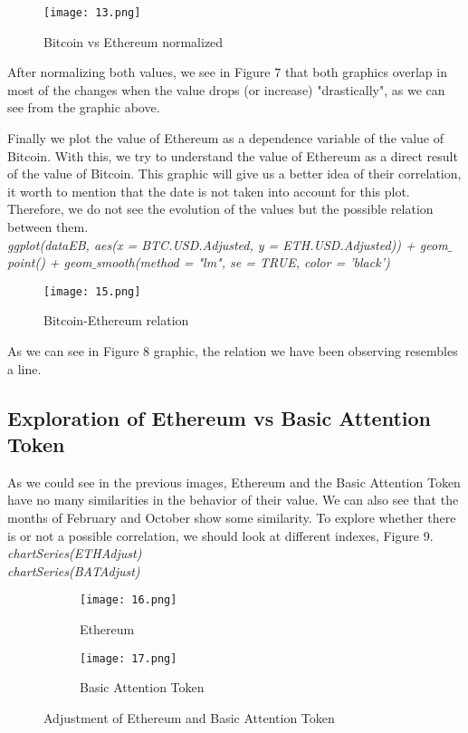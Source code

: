 \documentclass[14pt]{amsart}
\begin{document}
\begin{figure}[h!]
  \texttt{[image: 13.png]}
  \caption{Bitcoin vs Ethereum normalized}
  \label{fig:boat1}
\end{figure}

After normalizing both values, we see in Figure 7 that both graphics overlap in most of the changes when the value drops (or increase) "drastically", as we can see from the graphic above.

Finally we plot the value of Ethereum as a dependence variable of the value of Bitcoin. With this, we try to understand the value of Ethereum as a direct result of the value of Bitcoin. This graphic will give us a better idea of their correlation, it worth to mention that the date is not taken into account for this plot. Therefore, we do not see the evolution of the values but the possible relation between them.\\

\noindent \textit{ggplot(dataEB, aes(x = BTC.USD.Adjusted, y = ETH.USD.Adjusted)) + geom$\_$point() +  geom$\_$smooth(method = "lm", se = TRUE, color = 'black')}

\begin{figure}[h!]
  \texttt{[image: 15.png]}
  \caption{Bitcoin-Ethereum relation}
  \label{fig:boat1}
\end{figure}

As we can see in Figure 8 graphic, the relation we have been observing resembles a line.

\subsection{Exploration of Ethereum vs Basic Attention Token}
As we could see in the previous images, Ethereum and the Basic Attention Token have no many similarities in the behavior of their value. We can also see that the months of February and October show some similarity. To explore whether there is or not a possible correlation, we should look at different indexes, Figure 9.\\

\noindent \textit{chartSeries(ETHAdjust)}\\
\noindent \textit{chartSeries(BATAdjust)}

\begin{figure}[h!]
  \centering
  \begin{subfigure}[b]{0.4\linewidth}
    \texttt{[image: 16.png]}
    \caption{Ethereum}
  \end{subfigure}
  \begin{subfigure}[b]{0.4\linewidth}
    \texttt{[image: 17.png]}
    \caption{Basic Attention Token}
  \end{subfigure}
  \caption{Adjustment of Ethereum and Basic Attention Token}
  \label{fig:coffee}
\end{figure}
\end{document}
